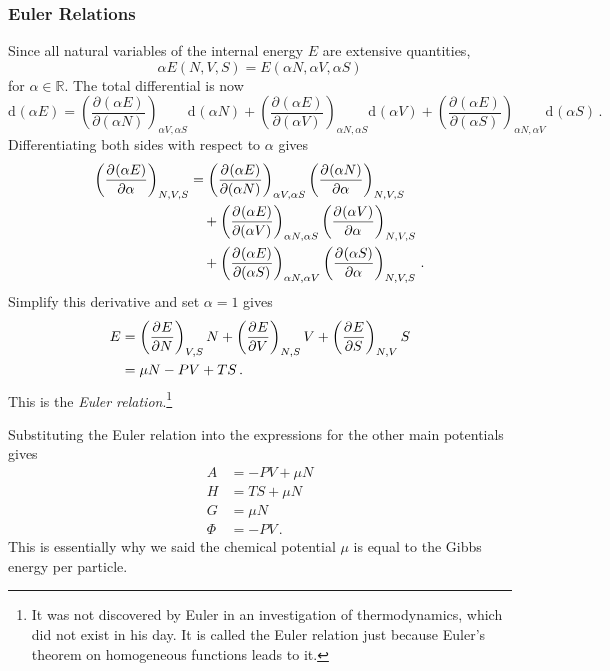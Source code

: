 \documentclass{article}
\theoremstyle{plain}\theoremheaderfont{\normalfont\bfseries}\theorembodyfont{\rmfamily}\theoremseparator{.}\newtheorem*{thm}{Theorem}\newtheorem*{law}{Law}\newtheorem*{pos}{Postulate}
\numberwithin{equation}{section}
\renewcommand{\d}[2][]{\mathrm{d}^{#1} #2}
\newcommand{\pdv}[3][]{\frac{\partial^{#1} #2}{{\partial #3}^{#1}}}
\begin{document}
    \subsubsection{Euler Relations}
    Since all natural variables of the internal energy \(E\) are extensive quantities,
    \begin{equation}
        \alpha E(N,V,S)=E(\alpha N, \alpha V, \alpha S)
    \end{equation}
    for \(\alpha\in\mathbb{R}\). The total differential is now
    \begin{equation}
        \d{(\alpha E)}=\left(\pdv{(\alpha E)}{(\alpha N)}\right)_{\alpha V,\alpha S}\d{(\alpha N)}+\left(\pdv{(\alpha E)}{(\alpha V)}\right)_{\alpha N,\alpha S}\d{(\alpha V)}+\left(\pdv{(\alpha E)}{(\alpha S)}\right)_{\alpha N, \alpha V}\d{(\alpha S)}\,.
    \end{equation}
    Differentiating both sides with respect to \(\alpha\) gives
    \begin{align}
        \left(\pdv{(\alpha E)}{\alpha}\right)_{N,V,S}&=\left(\pdv{(\alpha E)}{(\alpha N)}\right)_{\alpha V,\alpha S}\left(\pdv{(\alpha N)}{\alpha}\right)_{N,V,S}\notag\\
        &\quad +\left(\pdv{(\alpha E)}{(\alpha V)}\right)_{\alpha N,\alpha S}\left(\pdv{(\alpha V)}{\alpha}\right)_{N,V,S}\notag\\
        &\quad +\left(\pdv{(\alpha E)}{(\alpha S)}\right)_{\alpha N, \alpha V}\left(\pdv{(\alpha S)}{\alpha}\right)_{N,V,S}\,.
    \end{align}
    Simplify this derivative and set \(\alpha=1\) gives
    \begin{align}
        E&=\left(\pdv{E}{N}\right)_{V,S}N+\left(\pdv{E}{V}\right)_{N,S}V+\left(\pdv{E}{S}\right)_{N,V}S\notag\\
        &=\mu N-PV+TS\,.
    \end{align}
    This is the \textit{Euler relation}.\footnote{It was not discovered by Euler in an investigation of thermodynamics, which did not exist in his day. It is called the Euler relation just because Euler's theorem on homogeneous functions leads to it.}

    Substituting the Euler relation into the expressions for the other main potentials gives
    \begin{align}
        A&=-PV+\mu N\\
        H&=TS+\mu N\\
        G&=\mu N\\
        \Phi&=-PV\,.
    \end{align}
    This is essentially why we said the chemical potential \(\mu\) is equal to the Gibbs energy per particle.
\end{document}
